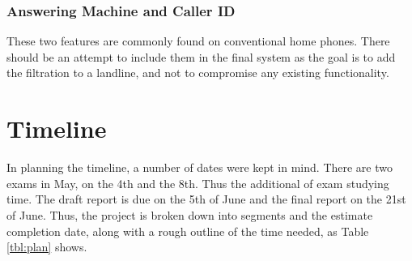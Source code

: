 \documentclass[12pt,a4paper]{report}
\begin{document}
\subsubsection{Answering Machine and Caller ID}
These two features are commonly found on conventional home phones. There should be an attempt to include them in the final system as the goal is to add the filtration to a landline, and not to compromise any existing functionality.

\section{Timeline}
In planning the timeline, a number of dates were kept in mind. There are two exams in May, on the 4th and the 8th. Thus the additional of exam studying time. The draft report is due on the 5th of June and the final report on the 21st of June. Thus, the project is broken down into segments and the estimate completion date, along with a rough outline of the time needed, as Table \ref{tbl:plan} shows.

\begin{table}[H]
\centering
{}
\caption{Project Timeline Planning}
\label{tbl:plan}
\end{table}
\end{document}

